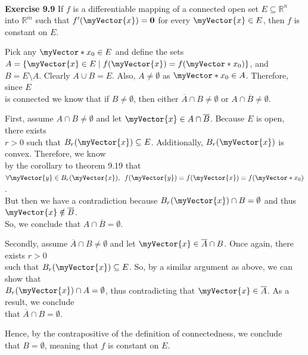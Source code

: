 \documentclass{book}
\newcommand{\exOne}{%
   \color{Purple}%
   \fontsize{14}{16}\selectfont%
}
\newcommand{\exTwo}{%
   \color{RedViolet}%
   \fontsize{13}{15}\selectfont%
}
\newenvironment{myIndent}{%
   \begin{adjustwidth}{2.5em}{0em}%
}{%
   \end{adjustwidth}%
}
\newcommand{\myHS}{ \hspace{0.5em}}
\newcommand{\mySepTwo}[1][.]{%
   {\noindent\color{#1}{\rule{6.5in}{0.5mm}}}\\%
}
\newcommand{\retTwo}{\hfill\bigbreak}
\newcommand{\mVec}[1]{\myVector{#1}}
\newcommand{\mVecAst}[1]{\myVector*{#1}}
\newcommand{\mMat}[1]{\mathbf{#1}}
\begin{document}
\newpage

\exOne
\mySepTwo 

\textbf{Exercise 9.9} If $f$ is a differentiable mapping of a connected open set $E \subseteq \mathbb{R}^n$\\ into $\mathbb{R}^m$ such that $f^\prime(\mVec{x}) = \mMat{0}$ for every $\mVec{x} \in E$, then $f$ is constant on $E$.\\ [-6pt]

{\begin{myIndent}\exTwo

   Pick any $\mVecAst{x}_0 \in E$ and define the sets $A = \{\mVec{x} \in E \mid f(\mVec{x}) = f(\mVecAst{x}_0 )\}$, and\\ [1pt] $B = E \setminus A$. Clearly $A \cup B = E$. Also, $A \neq \emptyset$ as $\mVecAst{x}_0 \in A$. Therefore, since $E$\\ [1pt] is connected we know that if $B \neq \emptyset$, then either $\overline{A} \cap B \neq \emptyset$ or $A \cap \overline{B} \neq \emptyset$.\retTwo

   First, assume $A \cap \overline{B} \neq \emptyset$ and let $\mVec{x} \in A \cap \overline{B}$. Because $E$ is open, there exists\\ $r > 0$ such that $B_r(\mVec{x}) \subseteq E$. Additionally, $B_r(\mVec{x})$ is convex. Therefore, we know\\ by the corollary to theorem 9.19 that $\forall \mVec{y} \in B_r(\mVec{x}), \myHS f(\mVec{y}) = f(\mVec{x}) = f(\mVecAst{x}_0)$.\\ [1pt] But then we have a contradiction because $B_r(\mVec{x}) \cap B = \emptyset$ and thus $\mVec{x} \notin \overline{B}$.\\ [1pt] So, we conclude that $A \cap \overline{B} = \emptyset$.\retTwo

   Secondly, assume $\overline{A} \cap B \neq \emptyset$ and let $\mVec{x} \in \overline{A} \cap B$. Once again, there exists $r > 0$\\ such that $B_r(\mVec{x}) \subseteq E$. So, by a similar argument as above, we can show that\\ $B_r(\mVec{x}) \cap A = \emptyset$, thus contradicting that $\mVec{x} \in \overline{A}$. As a result, we conclude\\ [1pt] that $\overline{A} \cap B = \emptyset$.\retTwo

   Hence, by the contrapositive of the definition of connectedness, we conclude\\ that $B = \emptyset$, meaning that $f$ is constant on $E$.\retTwo
\end{myIndent}}
\end{document}
